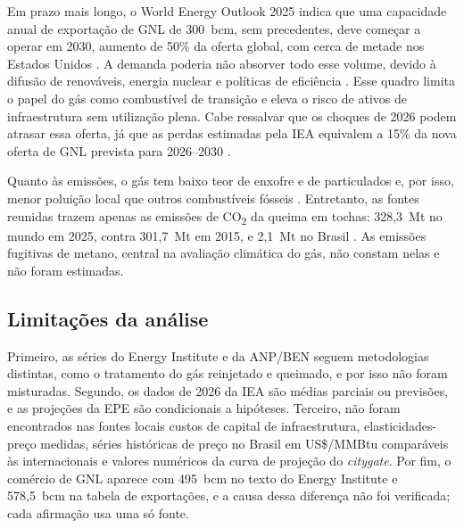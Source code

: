 Em prazo mais longo, o World Energy Outlook 2025 indica que uma capacidade anual de exportação de GNL de 300~bcm, sem precedentes, deve começar a operar em 2030, aumento de 50\% da oferta global, com cerca de metade nos Estados Unidos \cite{iea2025weo}. A demanda poderia não absorver todo esse volume, devido à difusão de renováveis, energia nuclear e políticas de eficiência \cite{iea2025weo}. Esse quadro limita o papel do gás como combustível de transição e eleva o risco de ativos de infraestrutura sem utilização plena. Cabe ressalvar que os choques de 2026 podem atrasar essa oferta, já que as perdas estimadas pela IEA equivalem a 15\% da nova oferta de GNL prevista para 2026--2030 \cite{iea2026gas}.

Quanto às emissões, o gás tem baixo teor de enxofre e de particulados e, por isso, menor poluição local que outros combustíveis fósseis \cite{pinto2007}. Entretanto, as fontes reunidas trazem apenas as emissões de CO\textsubscript{2} da queima em tochas: 328,3~Mt no mundo em 2025, contra 301,7~Mt em 2015, e 2,1~Mt no Brasil \cite{ei2026}. As emissões fugitivas de metano, central na avaliação climática do gás, não constam nelas e não foram estimadas.

\subsection{Limitações da análise}
Primeiro, as séries do Energy Institute e da ANP/BEN seguem metodologias distintas, como o tratamento do gás reinjetado e queimado, e por isso não foram misturadas. Segundo, os dados de 2026 da IEA são médias parciais ou previsões, e as projeções da EPE são condicionais a hipóteses. Terceiro, não foram encontrados nas fontes locais custos de capital de infraestrutura, elasticidades-preço medidas, séries históricas de preço no Brasil em US\$/MMBtu comparáveis às internacionais e valores numéricos da curva de projeção do \emph{citygate}. Por fim, o comércio de GNL aparece com 495~bcm no texto do Energy Institute e 578,5~bcm na tabela de exportações, e a causa dessa diferença não foi verificada; cada afirmação usa uma só fonte.
